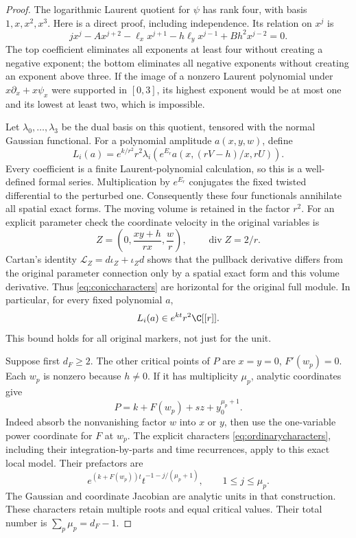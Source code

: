 \begin{proof}
The logarithmic Laurent quotient for $\psi$ has rank four, with
basis $1,x,x^2,x^3$. Here is a direct proof, including independence.
Its relation on $x^j$ is
\[
 jx^j-Ax^{j+2}-\ell_xx^{j+1}
             -h\ell_yx^{j-1}+Bh^2x^{j-2}=0.
\]
The top coefficient eliminates all exponents at least four without
creating a negative exponent; the bottom eliminates all negative
exponents without creating an exponent above three. If the image
of a nonzero Laurent polynomial under $x\partial_x+x\psi_x$
were supported in $[0,3]$, its highest exponent would be at most
one and its lowest at least two, which is impossible.

Let $\lambda_0,\ldots,\lambda_3$ be the dual basis on this
quotient, tensored with the normal Gaussian functional. For a
polynomial amplitude $a(x,y,w)$, define
\begin{equation}\label{eq:coniccharacters}
 L_i(a)=e^{k/r^2}r^2\lambda_i\!\left(
    e^{E_r}a(x,(rV-h)/x,rU)\right).
\end{equation}
Every coefficient is a finite Laurent-polynomial calculation, so
this is a well-defined formal series. Multiplication by $e^{E_r}$
conjugates the fixed twisted differential to the perturbed one.
Consequently these four functionals annihilate all spatial exact
forms. The moving volume is retained in the factor $r^2$.
For an explicit parameter check the coordinate velocity in the
original variables is
\[
 Z=\left(0,\frac{xy+h}{rx},\frac wr\right),
                   \qquad \operatorname{div}Z=2/r.
\]
Cartan's identity $\mathcal L_Z=d\iota_Z+\iota_Zd$ shows that
the pullback derivative differs from the original parameter
connection only by a spatial exact form and this volume
derivative. Thus \eqref{eq:coniccharacters} are horizontal for
the original full module. In particular, for every fixed
polynomial $a$,
\begin{equation}\label{eq:conicseedorder}
 L_i(a)\in e^{kt}r^2\C[[r]].
\end{equation}
This bound holds for all original markers, not just for the unit.

Suppose first $d_F\ge2$. The other critical points of $P$ are
$x=y=0$, $F'(w_p)=0$. Each $w_p$ is nonzero because $h\ne0$.
If it has multiplicity $\mu_p$, analytic coordinates give
\[
 P=k+F(w_p)+s z+y_0^{\mu_p+1}.
\]
Indeed absorb the nonvanishing factor $w$ into $x$ or $y$, then
use the one-variable power coordinate for $F$ at $w_p$.
The explicit characters \eqref{eq:ordinarycharacters}, including
their integration-by-parts and time recurrences, apply to this
exact local model. Their prefactors are
\[
 e^{(k+F(w_p))t}t^{-1-j/(\mu_p+1)},
                    \qquad 1\le j\le\mu_p.
\]
The Gaussian and coordinate Jacobian are analytic units in that
construction. These characters retain multiple roots and equal
critical values. Their total number is $\sum_p\mu_p=d_F-1$.


\end{proof}
